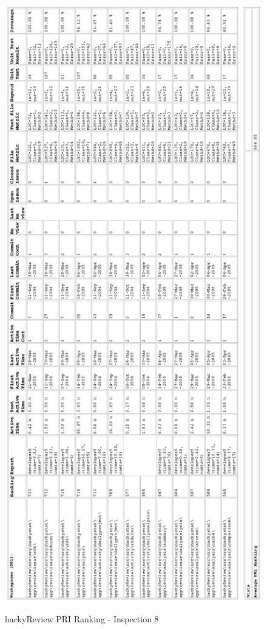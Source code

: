\begin{figure}[!h]
  \centering
  \caption{hackyReview PRI Ranking - Inspection 8}
  \includegraphics[totalheight=1.0\textheight]{figs/Results/8_2005-04-05-hackyReview-printable.eps}
  \label{fig:inspection8-hackyReview-ranking}
\end{figure}

